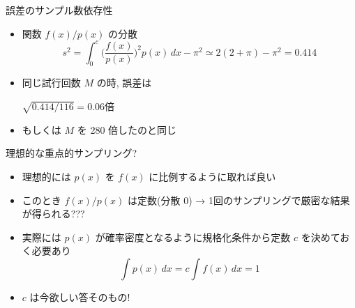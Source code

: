 \begin{frame}[t,fragile]{誤差のサンプル数依存性}
  \begin{itemize}
    \setlength{\itemsep}{1em}
  \item 関数 $f(x)/p(x)$ の分散
    \[
    s^2 = \int_0^c \Big(\frac{f(x)}{p(x)}\Big)^2 p(x) \, dx - \pi^2 \simeq 2(2+\pi) - \pi^2 = 0.414
    \]
  \item 同じ試行回数 $M$ の時, 誤差は

    $\sqrt{0.414/116} = 0.06 \mbox{倍}$

  \item もしくは $M$ を 280 倍したのと同じ
  \vspace*{-5em}
  \hspace*{15em}
  \end{itemize}
\end{frame}

\begin{frame}[t,fragile]{理想的な重点的サンプリング?}
  \begin{itemize}
    \setlength{\itemsep}{1em}
  \item 理想的には $p(x)$ を $f(x)$ に比例するように取れば良い
  \item このとき $f(x) / p(x)$ は定数(分散 0) → 1回のサンプリングで厳密な結果が得られる???
  \item 実際には $p(x)$ が確率密度となるように規格化条件から定数 $c$ を決めておく必要あり
    \[
    \int p(x) \, dx = c \int f(x) \, dx = 1
    \]
  \item $c$ は今欲しい答そのもの!
  \end{itemize}
\end{frame}
